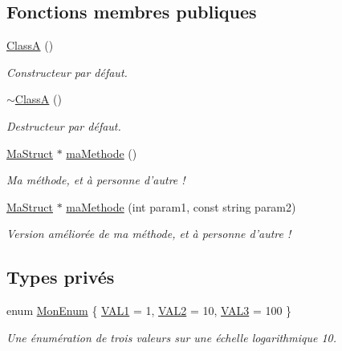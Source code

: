 \subsection*{Fonctions membres publiques}
\begin{DoxyCompactItemize}
\item 
\hyperlink{class_class_a_acd165fa87ae77eeb9c715024c0301a6b}{ClassA} ()
\begin{DoxyCompactList}\small\item\em Constructeur par défaut. \item\end{DoxyCompactList}\item 
\hyperlink{class_class_a_a6ead4513f775571caf3c0387d535783f}{$\sim$ClassA} ()
\begin{DoxyCompactList}\small\item\em Destructeur par défaut. \item\end{DoxyCompactList}\item 
\hyperlink{struct_class_a_1_1_ma_struct}{MaStruct} $\ast$ \hyperlink{class_class_a_aa95d318339e8bdb65954c7942f1e1f78}{maMethode} ()
\begin{DoxyCompactList}\small\item\em Ma méthode, et à personne d'autre ! \item\end{DoxyCompactList}\item 
\hyperlink{struct_class_a_1_1_ma_struct}{MaStruct} $\ast$ \hyperlink{class_class_a_a30a91a34f55c7cafb8922c55c0e99d50}{maMethode} (int param1, const string param2)
\begin{DoxyCompactList}\small\item\em Version améliorée de ma méthode, et à personne d'autre ! \item\end{DoxyCompactList}\end{DoxyCompactItemize}
\subsection*{Types privés}
\begin{DoxyCompactItemize}
\item 
enum \hyperlink{class_class_a_aebd12939da3b00aca5f7c04a0f34f0d4}{MonEnum} \{ \hyperlink{class_class_a_aebd12939da3b00aca5f7c04a0f34f0d4a9db1f0ab44af74bb349827f67c63835d}{VAL1} =  1, 
\hyperlink{class_class_a_aebd12939da3b00aca5f7c04a0f34f0d4a2aa208680503684c42107f008350be56}{VAL2} =  10, 
\hyperlink{class_class_a_aebd12939da3b00aca5f7c04a0f34f0d4ab9438dfedb4070dba86d8dfaf4562851}{VAL3} =  100
 \}
\begin{DoxyCompactList}\small\item\em Une énumération de trois valeurs sur une échelle logarithmique 10. \item\end{DoxyCompactList}\end{DoxyCompactItemize}
